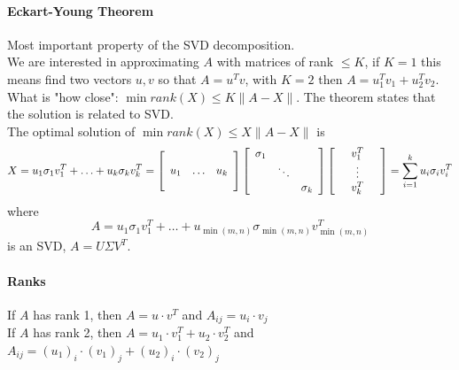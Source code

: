 \documentclass[10pt]{report}
\begin{document}
\paragraph{Eckart-Young Theorem} Most important property of the SVD decomposition.\\
We are interested in approximating $A$ with matrices of rank $\leq K$, if $K = 1$ this means find two vectors $u, v$ so that $A = u^T v$, with $K=2$ then $A = u_1^T v_1 + u_2^T v_2$. What is "how close": $\min{rank(X) \leq K}\|A - X\|$. The theorem states that the solution is related to SVD.\\
The optimal solution of $\min{rank(X) \leq X}\|A - X\|$ is $$X = u_1\sigma_1 v_1^T + \ldots + u_k\sigma_k v_k^T = \left[\begin{array}{c c c}
\\
u_1&\ldots&u_k\\
\\
\end{array}\right]\left[\begin{array}{c c c}
\sigma_1\\
&\ddots\\
&&\sigma_k
\end{array}\right]\left[\begin{array}{c c c}
&v_1^T&\\&\vdots&\\&v_k^T&
\end{array}\right] = \sum_{i=1}^ku_i\sigma_iv_i^T$$
where $$A = u_1\sigma_1 v_1^T + \ldots + u_{\min(m,n)}\sigma_{\min(m,n)} v_{\min(m,n)}^T$$ is an SVD, $A = U\Sigma V^T$.
\paragraph{Ranks} If $A$ has rank 1, then $A = u\cdot v^T$ and $A_{ij} = u_i\cdot v_j$\\
If $A$ has rank 2, then $A= u_1\cdot v_1^T + u_2\cdot v_2^T$ and $A_{ij} = (u_1)_i\cdot (v_1)_j + (u_2)_i\cdot (v_2)_j$
\end{document}
